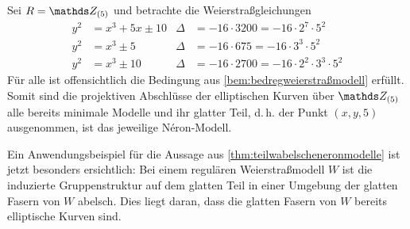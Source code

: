 \documentclass[german, bibliography=totoc]{scrreprt}
\begin{document}
\begin{Beispiel}
  Sei $R=\Z_{(5)}$ und betrachte die Weierstraßgleichungen
  \begin{align*}
    y^2&=x^3+5x\pm 10
    & \Delta&=-16\cdot3200=-16\cdot2^7\cdot5^2\\
    y^2&=x^3\pm 5
    & \Delta&=-16\cdot675=-16\cdot3^3\cdot5^2\\
    y^2&=x^3\pm 10
    & \Delta&=-16\cdot2700=-16\cdot2^2\cdot3^3\cdot5^2
  \end{align*}
  Für alle ist offensichtlich die Bedingung aus
  \ref{bem:bedregweierstraßmodell} erfüllt.
  Somit sind die projektiven Abschlüsse der elliptischen Kurven über
  $\Z_{(5)}$ alle bereits minimale Modelle und ihr glatter Teil,
  d.\,h. der Punkt $(x,y,5)$ ausgenommen, ist das jeweilige
  Néron-Modell.
\end{Beispiel}

\begin{Beispiel}
  Ein Anwendungsbeispiel für die Aussage aus
  \ref{thm:teilwabelscheneronmodelle} ist jetzt besonders ersichtlich:
  Bei einem regulären Weierstraßmodell $W$ ist die induzierte
  Gruppenstruktur auf dem glatten Teil in einer Umgebung der glatten
  Fasern von $W$ abelsch.
  Dies liegt daran, dass die glatten Fasern von $W$ bereits
  elliptische Kurven sind.
\end{Beispiel}
\end{document}
